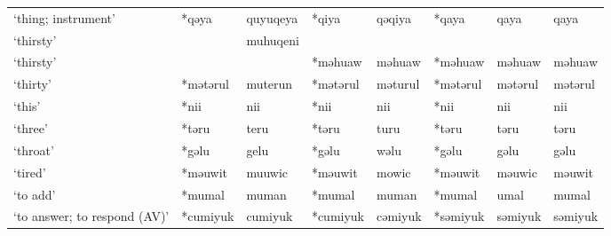 \begin{landscape}
\begin{longtable}[c]{@{}p{3cm}<{\raggedright}p{2.75cm}<{\raggedright}p{2.75cm}<{\raggedright}p{2.75cm}<{\raggedright}p{2.75cm}<{\raggedright}p{2.75cm}<{\raggedright}p{2.75cm}<{\raggedright}p{2.75cm}<{\raggedright}@{}}
`thing; instrument'                                  & *qəya              & quyuqeya                       & *qiya              & qəqiya                     & *qaya            & qaya                     & qaya                              \\
`thirsty'                                            &                    & muhuqeni                       &                    &                            &                  &                          &                                   \\
`thirsty'                                            &                    &                                & *məhuaw            & məhuaw                     & *məhuaw          & məhuaw                   & məhuaw                            \\
`thirty'                                             & *mətərul           & muterun                        & *mətərul           & məturul                    & *mətərul         & mətərul                  & mətərul                           \\
`this'                                               & *nii               & nii                            & *nii               & nii                        & *nii             & nii                      & nii                               \\
`three'                                              & *təru              & teru                           & *təru              & turu                       & *təru            & təru                     & təru                              \\
`throat'                                             & *gəlu              & gelu                           & *gəlu              & wəlu                       & *gəlu            & gəlu                     & gəlu                              \\
`tired'                                              & *məuwit            & muuwic                         & *məuwit            & mowic                      & *məuwit          & məuwic                   & məuwit                            \\
`to add'                                             & *mumal             & muman                          & *mumal             & muman                      & *mumal           & umal                     & mumal                             \\
`to answer; to respond (AV)'                         & *cumiyuk           & cumiyuk                        & *cumiyuk           & cəmiyuk                    & *səmiyuk         & səmiyuk                  & səmiyuk                           \\

\end{longtable}
\end{landscape}
